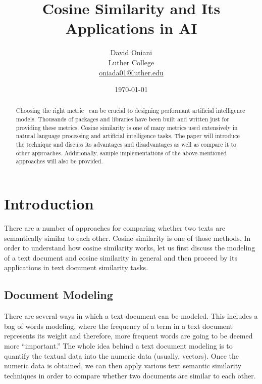 \documentclass[11pt]{article}
\author{David Oniani\\
        Luther College\\
        \href{mailto:oniada01@luther.edu}{oniada01@luther.edu}}
\title{\textbf{Cosine Similarity and Its Applications in AI}}
\date{\today}
\begin{document}
\maketitle


\begin{abstract}
  \noindent Choosing the right metric~\cite{thomas2020} can be crucial to
  designing performant artificial intelligence models. Thousands of packages
  and libraries have been built and written just for providing these metrics.
  Cosine similarity is one of many metrics used extensively in natural language
  processing and artificial intelligence tasks. The paper will introduce the
  technique and discuss its advantages and disadvantages as well as compare it
  to other approaches. Additionally, sample implementations of the
  above-mentioned approaches will also be provided.
\end{abstract}


\newpage
\tableofcontents
\newpage


\section{Introduction}

There are a number of approaches for comparing whether two texts are
semantically similar to each other. Cosine similarity is one of those methods.
In order to understand how cosine similarity works, let us first discuss the
modeling of a text document and cosine similarity in general and then proceed
by its applications in text document similarity tasks.

\subsection{Document Modeling}

There are several ways in which a text document can be modeled. This includes a
bag of words modeling, where the frequency of a term in a text document
represents its weight and therefore, more frequent words are going to be deemed
more ``important.'' The whole idea behind a text document modeling is to
quantify the textual data into the numeric data (usually, vectors). Once the
numeric data is obtained, we can then apply various text semantic similarity
techniques in order to compare whether two documents are similar to each other.
\end{document}
